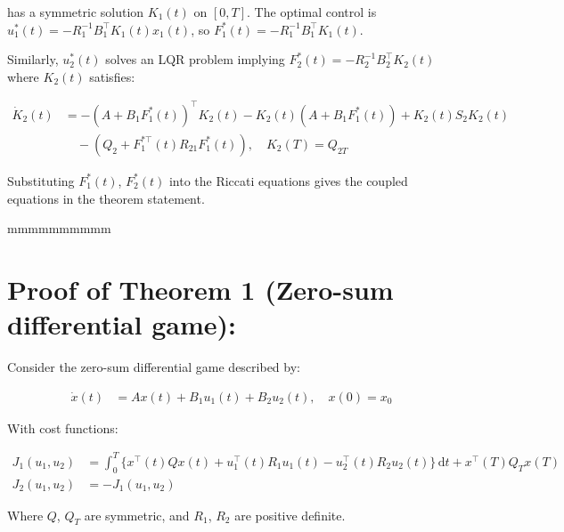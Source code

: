 \documentclass[3p]{elsarticle}
\begin{document}
has a symmetric solution $K_1(t)$ on $[0,T]$. The optimal control is $u_1^*(t) = -R_1^{-1}B_1^\top K_1(t) x_1(t)$, so $F_1^*(t) = -R_1^{-1}B_1^\top K_1(t)$.

Similarly, $u_2^*(t)$ solves an LQR problem implying $F_2^*(t) = -R_2^{-1}B_2^\top K_2(t)$ where $K_2(t)$ satisfies: 

\begin{align*}
\dot{K}_2(t) &= -(A+B_1F_1^*(t))^\top K_2(t) - K_2(t)(A+B_1F_1^*(t)) + K_2(t)S_2K_2(t) \\  
&\quad - (Q_2 + F_{1}^{*\top}(t)R_{21}F_1^*(t)), \quad K_2(T) = Q_{2T}
\end{align*}

Substituting $F_1^*(t)$, $F_2^*(t)$ into the Riccati equations gives the coupled equations in the theorem statement.




mmmmmmmmmm

\section*{Proof of Theorem 1 (Zero-sum differential game):}

Consider the zero-sum differential game described by:

\begin{align*}
\dot{x}(t) &= Ax(t) + B_1u_1(t) + B_2u_2(t), \quad x(0)=x_0
\end{align*}

With cost functions:

\begin{align*}
J_1(u_1,u_2) &= \int_0^T \{x^\top (t)Qx(t) + u_1^\top(t) R_1u_1(t) - u_2^\top(t)R_2u_2(t)\}\,\mathrm{d}t + x^\top(T)Q_Tx(T) \\
J_2(u_1,u_2) &= -J_1(u_1,u_2)
\end{align*}

Where $Q$, $Q_T$ are symmetric, and $R_1$, $R_2$ are positive definite.
\end{document}
